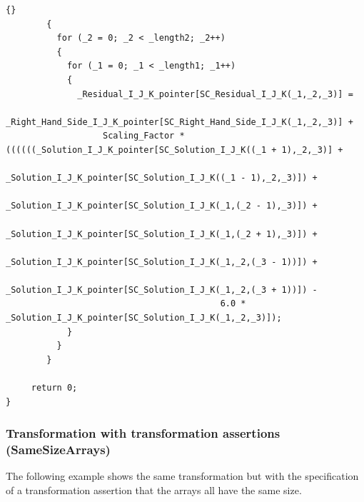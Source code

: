 \documentclass[10pt]{article}
\begin{document}
\begin{lstlisting}{}
        { 
          for (_2 = 0; _2 < _length2; _2++)
          { 
            for (_1 = 0; _1 < _length1; _1++)
            { 
              _Residual_I_J_K_pointer[SC_Residual_I_J_K(_1,_2,_3)] =
                   _Right_Hand_Side_I_J_K_pointer[SC_Right_Hand_Side_I_J_K(_1,_2,_3)] + 
                   Scaling_Factor * ((((((_Solution_I_J_K_pointer[SC_Solution_I_J_K((_1 + 1),_2,_3)] + 
                                          _Solution_I_J_K_pointer[SC_Solution_I_J_K((_1 - 1),_2,_3)]) +
                                          _Solution_I_J_K_pointer[SC_Solution_I_J_K(_1,(_2 - 1),_3)]) +
                                          _Solution_I_J_K_pointer[SC_Solution_I_J_K(_1,(_2 + 1),_3)]) + 
                                          _Solution_I_J_K_pointer[SC_Solution_I_J_K(_1,_2,(_3 - 1))]) +
                                          _Solution_I_J_K_pointer[SC_Solution_I_J_K(_1,_2,(_3 + 1))]) -
                                          6.0 * _Solution_I_J_K_pointer[SC_Solution_I_J_K(_1,_2,_3)]); 
            } 
          } 
        } 

     return 0;
} 
\end{lstlisting}


\subsubsection{Transformation with transformation assertions (SameSizeArrays)}

   The following example shows the same transformation but with the specification of a
transformation assertion that the arrays all have the same size.
\end{document}
